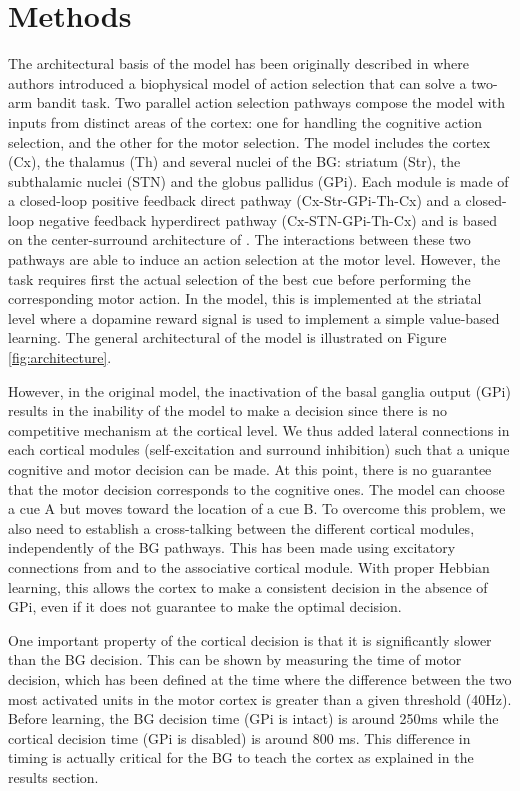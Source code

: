 \section{Methods}

The architectural basis of the model has been originally described in
\citet{Guthrie:2013} where authors introduced a biophysical model of action
selection that can solve a two-arm bandit task. Two parallel action selection
pathways compose the model with inputs from distinct areas of the cortex: one
for handling the cognitive action selection, and the other for the motor
selection. The model includes the cortex (Cx), the thalamus (Th) and several
nuclei of the BG: striatum (Str), the subthalamic nuclei (STN) and the globus
pallidus (GPi). Each module is made of a closed-loop positive feedback direct
pathway (Cx-Str-GPi-Th-Cx) and a closed-loop negative feedback hyperdirect
pathway (Cx-STN-GPi-Th-Cx) and is based on the center-surround architecture of
\cite{Mink:1996}. The interactions between these two pathways are able to
induce an action selection at the motor level. However, the task requires first
the actual selection of the best cue before performing the corresponding motor
action. In the \citet{Guthrie:2013} model, this is implemented at the striatal
level where a dopamine reward signal is used to implement a simple value-based
learning. The general architectural of the model is illustrated on Figure
\ref{fig:architecture}.

However, in the original model, the inactivation of the basal ganglia output
(GPi) results in the inability of the model to make a decision since there is
no competitive mechanism at the cortical level. We thus added lateral
connections in each cortical modules (self-excitation and surround inhibition)
such that a unique cognitive and motor decision can be made. At this point,
there is no guarantee that the motor decision corresponds to the cognitive
ones. The model can choose a cue A but moves toward the location of a cue B. To
overcome this problem, we also need to establish a cross-talking between the
different cortical modules, independently of the BG pathways. This has been
made using excitatory connections from and to the associative cortical
module. With proper Hebbian learning, this allows the cortex to make a
consistent decision in the absence of GPi, even if it does not guarantee to
make the optimal decision.

One important property of the cortical decision is that it is significantly
slower than the BG decision. This can be shown by measuring the time of motor
decision, which has been defined at the time where the difference between the
two most activated units in the motor cortex is greater than a given threshold
(40Hz). Before learning, the BG decision time (GPi is intact) is around 250ms
while the cortical decision time (GPi is disabled) is around 800 ms. This
difference in timing is actually critical for the BG to teach the cortex as
explained in the results section.
